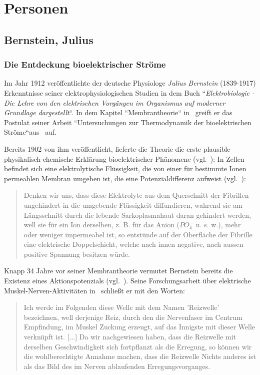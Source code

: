 \chapter{Personen}

\section{Bernstein, Julius}\label{appendix:bernstein}

\subsection*{Die Entdeckung bioelektrischer Ströme}

Im Jahr 1912 veröffentlichte der deutsche Physiologe \textit{Julius Bernstein} (1839-1917) Erkenntnisse seiner elektrophysiologischen Studien in dem Buch ``\textit{Elektrobiologie - Die Lehre von den elektrischen Vorgängen im Organismus auf moderner Grundlage dargestellt}``.
In dem Kapitel ``Membrantheorie`` in~\cite{Ber12} greift er das Postulat seiner Arbeit ``Untersuchungen zur Thermodynamik der bioelektrischen Ströme``aus~\cite{Ber02} auf.

Bereits 1902 von ihm veröffentlicht, lieferte die Theorie die erste plausible physikalisch-chemische Erklärung bioelektrischer Phänomene (vgl.~\cite[5]{Sey06}): In Zellen befindet sich eine elektrolytische Flüssigkeit, die von einer für bestimmte Ionen permeablen Membran umgeben ist, die eine Potenzialdifferenz aufweist (vgl.~\cite[92 f.]{Ber12}):

\blockquote[{\cite[542]{Ber02}}]{
    Denken wir uns, dass diese Elektrolyte aus dem Querschnitt der Fibrillen ungehindert in die umgebende Flüssigkeit diffundieren, wahrend sie am Längsschnitt durch die lebende Sarkoplasmahaut daran gehindert werden, well sie für ein Ion derselben, z. B. für das Anion ($PO^-_4$ u. s. w.), mehr oder weniger impermeabel ist, so entstünde auf der Oberfläche der Fibrille eine elektrische Doppelschicht, welche nach innen negative, nach aussen positive Spannung besitzen würde.
}

Knapp 34 Jahre vor seiner Membrantheorie vermutet Bernstein bereits die Existenz eines Aktionspotenzials (vgl.~\cite[168]{Sch83}). Seine Forschungsarbeit über elektrische Muskel-Nerven-Aktivitäten in~\cite{Ber68} schließt er mit den Worten:

\blockquote[{\cite[198 f.]{Ber68}}]{
    Ich werde im Folgenden diese Welle mit dem Namen 'Reizwelle' bezeichnen, well derjenige Reiz, durch den die Nervenfaser im Centrum Empfindung, im Muskel Zuckung erzeugt, auf das  Innigste mit dieser Welle verknüpft ist. {[...]} Da wir nachgewiesen haben, dass die Reizwelle mit derselben Geschwindigkeit sich fortpflanzt als die Erregung, so können wir die wohlberechtigte Annahme machen, dass die Reizwelle Nichts anderes ist als das Bild des im Nerven ablaufenden Erregungsvorganges.
}

